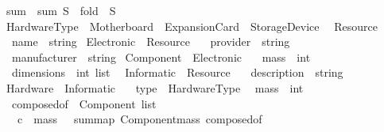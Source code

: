 \begin{isabellebody}
\begin{isamarkuptext}
\begin{isarbox}

\begin{isabelle}
\ sum\ \ {\isachardoublequoteopen}sum\ S\ {\isacharequal}{\kern0pt}\ {\isacharparenleft}{\kern0pt}fold\ {\isacharparenleft}{\kern0pt}{\isacharplus}{\kern0pt}{\isacharparenright}{\kern0pt}\ S\ {}{\isacharparenright}{\kern0pt}{\isachardoublequoteclose}\isanewline
\isanewline
{}\ Hardware{\isacharunderscore}{\kern0pt}Type\ {\isacharequal}{\kern0pt}\ Motherboard\ {\isacharbar}{\kern0pt}\ Expansion{\isacharunderscore}{\kern0pt}Card\ {\isacharbar}{\kern0pt}\ Storage{\isacharunderscore}{\kern0pt}Device\ \isacommand{{\isachardot}{\kern0pt}{\isachardot}{\kern0pt}}\isacommand{{\isachardot}{\kern0pt}}\isanewline
\isanewline
{}\ Resource\ {\isacharequal}{\kern0pt}\isanewline
\ \ name\ {\isacharcolon}{\kern0pt}{\isacharcolon}{\kern0pt}\ string\isanewline
{}\ Electronic\ {\isacharequal}{\kern0pt}\ Resource\ {\isacharplus}{\kern0pt}\isanewline
\ \ provider\ {\isacharcolon}{\kern0pt}{\isacharcolon}{\kern0pt}\ string\isanewline
\ \ manufacturer\ {\isacharcolon}{\kern0pt}{\isacharcolon}{\kern0pt}\ string\isanewline
{}\ Component\ {\isacharequal}{\kern0pt}\ Electronic\ {\isacharplus}{\kern0pt}\isanewline
\ \ mass\ {\isacharcolon}{\kern0pt}{\isacharcolon}{\kern0pt}\ int\isanewline
\ \ dimensions\ {\isacharcolon}{\kern0pt}{\isacharcolon}{\kern0pt}\ {\isachardoublequoteopen}int\ list{\isachardoublequoteclose}\ \isanewline
{}\ Informatic\ {\isacharequal}{\kern0pt}\ Resource\ {\isacharplus}{\kern0pt}\isanewline
\ \ description\ {\isacharcolon}{\kern0pt}{\isacharcolon}{\kern0pt}\ string\isanewline
{}\ Hardware\ {\isacharequal}{\kern0pt}\ Informatic\ {\isacharplus}{\kern0pt}\isanewline
\ \ type\ {\isacharcolon}{\kern0pt}{\isacharcolon}{\kern0pt}\ Hardware{\isacharunderscore}{\kern0pt}Type\isanewline
\ \ mass\ {\isacharcolon}{\kern0pt}{\isacharcolon}{\kern0pt}\ int\isanewline
\ \ composed{\isacharunderscore}{\kern0pt}of\ {\isacharcolon}{\kern0pt}{\isacharcolon}{\kern0pt}\ {\isachardoublequoteopen}Component\ list{\isachardoublequoteclose}\ \isanewline
\ \ \ c{}\ {\isacharcolon}{\kern0pt}{\isacharcolon}{\kern0pt}\ {\isachardoublequoteopen}mass\ {\isasymsigma}\ {\isacharequal}{\kern0pt}\ sum{\isacharparenleft}{\kern0pt}map\ Component{\isachardot}{\kern0pt}mass\ {\isacharparenleft}{\kern0pt}composed{\isacharunderscore}{\kern0pt}of\ {\isasymsigma}{\isacharparenright}{\kern0pt}{\isacharparenright}{\kern0pt}{\isachardoublequoteclose}
\end{isabelle}
\end{isarbox}


\end{isamarkuptext}
\end{isabellebody}
